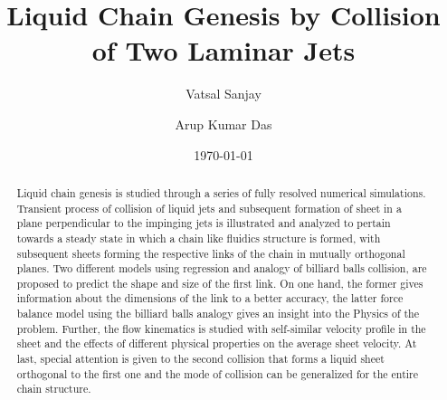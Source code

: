 \documentclass[%
aip,
sd,%
amsmath,amssymb,
preprint,%
author-year,%
]{revtex4-1}
\begin{document}
\newcommand{\MarkerCircleRed}{\raisebox{0.5pt}{\tikz{\node[draw,scale=0.4,circle,fill=red!100!red](){};}}}
\newcommand{\MarkerSquareRed}{\raisebox{0.5pt}{\tikz{\node[draw,scale=0.4,regular polygon, regular polygon sides=4,fill=black!20!red](){};}}}
\newcommand{\MarkerDiamondBlack}{\raisebox{0pt}{\tikz{\node[draw,scale=0.4,diamond,fill=black!100!](){};}}}


\title{Liquid Chain Genesis by Collision of Two Laminar Jets}
\author{Vatsal Sanjay}
\author{Arup Kumar Das}
\date{\today}

\begin{abstract}
Liquid chain genesis is studied through a series of fully resolved numerical simulations. Transient process of collision of liquid jets and subsequent formation of sheet in a plane perpendicular to the impinging jets is illustrated and analyzed to pertain towards a steady state in which a chain like fluidics structure is formed, with subsequent sheets forming the respective links of the chain in mutually orthogonal planes. Two different models using regression and analogy of billiard balls collision, are proposed to predict the shape and size of the first link. On one hand, the former gives information about the dimensions of the link to a better accuracy, the latter force balance model using the billiard balls analogy gives an insight into the Physics of the problem. Further, the flow kinematics is studied with self-similar velocity profile in the sheet and the effects of different physical properties on the average sheet velocity. At last, special attention is given to the second collision that forms a liquid sheet orthogonal to the first one and the mode of collision can be generalized for the entire chain structure.     
\end{abstract}
\maketitle
\end{document}
